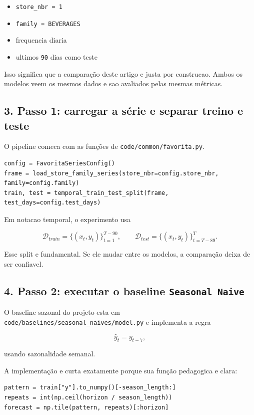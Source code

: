 \documentclass[12pt]{article}
\providecommand{\tightlist}{%
          \setlength{\itemsep}{0pt}\setlength{\parskip}{0pt}}
\begin{document}
\begin{itemize}
\tightlist
\item
  \texttt{store\_nbr\ =\ 1}
\item
  \texttt{family\ =\ BEVERAGES}
\item
  frequencia diaria
\item
  ultimos \texttt{90} dias como teste
\end{itemize}

Isso significa que a comparação deste artigo e justa por construcao. Ambos os modelos veem os mesmos dados e sao avaliados pelas mesmas métricas.

\subsection{3. Passo 1: carregar a série e separar treino e teste}\label{3-passo-1-carregar-a-suxe9rie-e-separar-treino-e-teste}

O pipeline comeca com as funções de \texttt{code/common/favorita.py}.

\begin{verbatim}
config = FavoritaSeriesConfig()
frame = load_store_family_series(store_nbr=config.store_nbr, family=config.family)
train, test = temporal_train_test_split(frame, test_days=config.test_days)
\end{verbatim}

Em notacao temporal, o experimento usa

\[
\mathcal{D}_{train} = \{(x_t, y_t)\}_{t=1}^{T-90},
\qquad
\mathcal{D}_{test} = \{(x_t, y_t)\}_{t=T-89}^T.
\]

Esse split e fundamental. Se ele mudar entre os modelos, a comparação deixa de ser confiavel.

\subsection{\texorpdfstring{4. Passo 2: executar o baseline \texttt{Seasonal\ Naive}}{4. Passo 2: executar o baseline Seasonal Naive}}\label{4-passo-2-executar-o-baseline-seasonal-naive}

O baseline sazonal do projeto esta em \texttt{code/baselines/seasonal\_naives/model.py} e implementa a regra

\[
\hat{y}_t = y_{t-7},
\]

usando sazonalidade semanal.

A implementação e curta exatamente porque sua função pedagogica e clara:

\begin{verbatim}
pattern = train["y"].to_numpy()[-season_length:]
repeats = int(np.ceil(horizon / season_length))
forecast = np.tile(pattern, repeats)[:horizon]
\end{verbatim}
\end{document}
